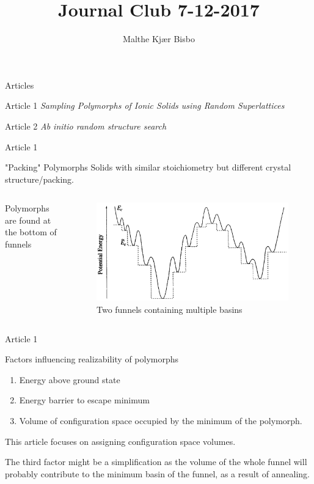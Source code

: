\documentclass{beamer}
\title{Journal Club 7-12-2017}
\author{Malthe Kj\ae r Bisbo}
\begin{document}
\begin{frame}
	\titlepage
\end{frame}

\begin{frame}{Articles}
	\begin{block}{Article 1}
		\textit{Sampling Polymorphs of Ionic Solids using Random Superlattices}
	\end{block}
	\begin{block}{Article 2}
		\textit{Ab initio random structure search}
	\end{block}
\end{frame}

\begin{frame}{Article 1}
\begin{block}{"Packing" Polymorphs}
	Solids with similar stoichiometry  but different crystal structure/packing.
\end{block}
\begin{columns}
	Polymorphs are found at the bottom of funnels
	
	\begin{figure}
		\centering
		\includegraphics[width=0.9\linewidth]{Funnel_of_basins}
		\caption{Two funnels containing multiple basins}
		\label{fig:funnelofbasins}
	\end{figure}
\end{columns}
\end{frame}

\begin{frame}{Article 1}
\begin{block}{Factors influencing realizability of polymorphs}
	\begin{enumerate}
		\item Energy above ground state
		\item Energy barrier to escape minimum
		\item Volume of configuration space occupied by the minimum of the polymorph.
	\end{enumerate}
\end{block}
This article focuses on assigning configuration space volumes.
\bigskip

The third factor might be a simplification as the volume of the whole funnel will probably contribute to the minimum basin of the funnel, as a result of annealing.
\end{frame}
\end{document}
